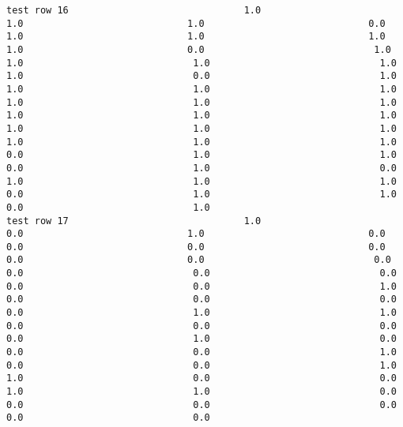 \documentclass[11pt]{article}
\begin{document}
\begin{verbatim}
test row 16                               1.0                             1.0                             1.0                             0.0                             1.0                             1.0                             1.0                             1.0                             0.0                              1.0                              1.0                              1.0                              1.0                              1.0                              0.0                              1.0                              1.0                              1.0                              1.0                              1.0                              1.0                              1.0                              1.0                              1.0                              1.0                              1.0                              1.0                              1.0                              1.0                              1.0                              1.0                              0.0                              1.0                              1.0                              0.0                              1.0                              0.0                              1.0                              1.0                              1.0                              0.0                              1.0                              1.0                              0.0                              1.0
test row 17                               1.0                             0.0                             1.0                             0.0                             0.0                             0.0                             0.0                             0.0                             0.0                              0.0                              0.0                              0.0                              0.0                              0.0                              0.0                              1.0                              0.0                              0.0                              0.0                              0.0                              1.0                              1.0                              0.0                              0.0                              0.0                              0.0                              1.0                              0.0                              0.0                              0.0                              1.0                              0.0                              0.0                              1.0                              1.0                              0.0                              0.0                              1.0                              1.0                              0.0                              0.0                              0.0                              0.0                              0.0                              0.0

\end{verbatim}
\end{document}
